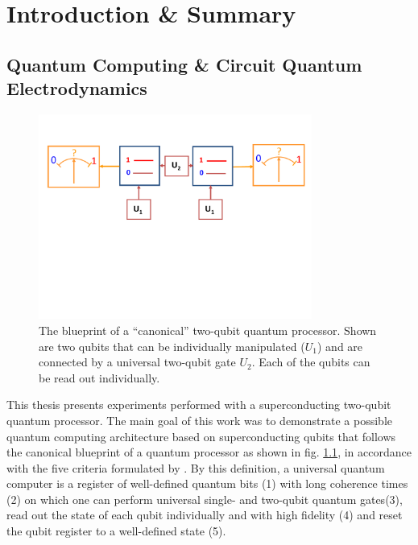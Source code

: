 \chapter{Introduction \& Summary}


\section{Quantum Computing \& Circuit Quantum Electrodynamics}

\begin{figure}
	\centering
		\includegraphics[width=0.8\textwidth]{./material/papers/grover/submission1/Fig1}
	\caption[Blueprint of a ``canonical'' two-qubit quantum processor]{The blueprint of a ``canonical'' two-qubit quantum processor. Shown are two qubits that can be individually manipulated ($U_1$) and are connected by a universal two-qubit gate $U_2$. Each of the qubits can be read out individually.}
	\label{fig:qubit_processor_blueprint}
\end{figure}

This thesis presents experiments performed with a superconducting two-qubit quantum processor. The main goal of this work was to demonstrate a possible quantum computing architecture based on superconducting qubits that follows the canonical blueprint of a quantum processor as shown in fig. \ref{fig:qubit_processor_blueprint}, in accordance with the five criteria formulated by \cite{divincenzo_physical_2000}. By this definition, a universal quantum computer is a register of well-defined quantum bits  (1) with long coherence times (2) on which one can perform universal single- and two-qubit quantum gates(3), read out the state of each qubit individually and with high fidelity (4) and reset the qubit register to a well-defined state (5).

